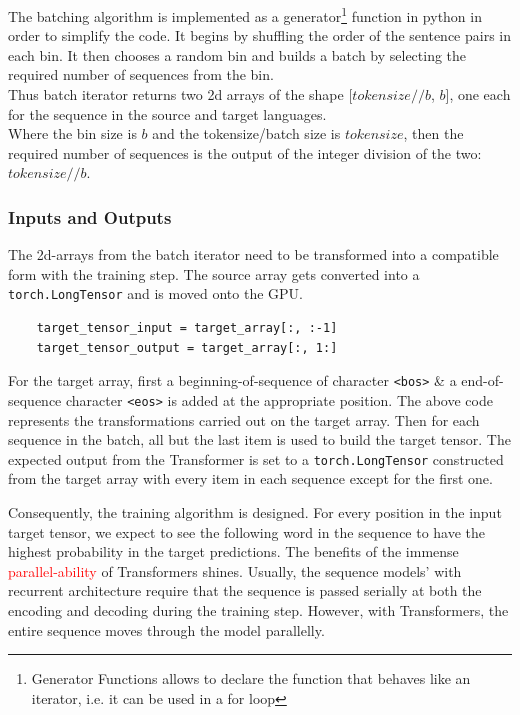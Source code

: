 \documentclass[12pt,a4paper,twoside,openright]{report}
\newcommand{\red}[1]{\textcolor{red}{#1}}
\begin{document}
The batching algorithm is implemented as a generator\footnote{Generator Functions allows to declare the function that behaves like an iterator, i.e. it can be used in a for loop} function in python in order to simplify the code. It begins by shuffling the order of the sentence pairs in each bin. It then chooses a random bin and builds a batch by selecting the required number of sequences from the bin. \\
Thus batch iterator returns two 2d arrays of the shape [$tokensize // b$, $b$], one each for the sequence in the source and target languages. \\
Where the bin size is $b$ and the tokensize/batch size is $tokensize$, then the required number of sequences is the output of the integer division of the two: $tokensize//b$.



\subsubsection{Inputs and Outputs}
The 2d-arrays from the batch iterator need to be transformed into a compatible form with the training step. The source array gets converted into a \lstinline{torch.LongTensor} and is moved onto the GPU.

\begin{lstlisting}
    target_tensor_input = target_array[:, :-1]
    target_tensor_output = target_array[:, 1:]
\end{lstlisting}

 For the target array, first a beginning-of-sequence of character \lstinline{<bos>} \& a end-of-sequence character \lstinline{<eos>} is added at the appropriate position. The above code represents the transformations carried out on the target array.
Then for each sequence in the batch, all but the last item is used to build the target tensor.
The expected output from the Transformer is set to a \lstinline{torch.LongTensor} constructed from the target array with every item in each sequence except for the first one.

Consequently, the training algorithm is designed. For every position in the input target tensor, we expect to see the following word in the sequence to have the highest probability in the target predictions. The benefits of the immense \red{parallel-ability} of Transformers shines. Usually, the sequence models' with recurrent architecture require that the sequence is passed serially at both the encoding and decoding during the training step. However, with Transformers, the entire sequence moves through the model parallelly.
\end{document}
